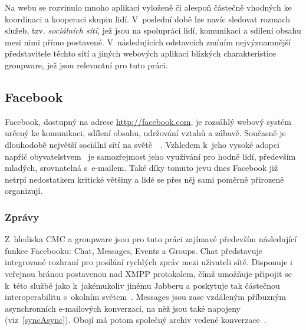 \documentclass[12pt,oneside,final]{fithesis2}
\begin{document}
Na webu se rozvinulo mnoho aplikací vyloženě či alespoň částečně vhodných ke koordinaci a kooperaci skupin lidí. V~poslední době lze navíc sledovat rozmach služeb, tzv. \emph{sociálních sítí}, jež jsou na spolupráci lidí, komunikaci a sdílení obsahu mezi nimi přímo postavené. V~následujících odstavcích zmíním nejvýznamnější představitele těchto sítí a jiných webových aplikací blízkých charakteristice groupware, jež jsou relevantní pro tuto práci.

\subsection{Facebook}\label{facebook}
Facebook, dostupný na adrese \url{http://facebook.com}, je rozsáhlý webový systém určený ke komunikaci, sdílení obsahu, udržování vztahů a zábavě. Současně je dlouhodobě největší sociální sítí na světě~\cite{kazeniac2009social}~\cite{protalinski2012facebook}. Vzhledem k~jeho vysoké adopci napříč obyvatelstvem~\cite{docekal2011socialni} je samozřejmost jeho využívání pro hodně lidí, především mladých, srovnatelná s~e-mailem. Také díky tomuto jevu dnes Facebook již netrpí nedostatkem kritické většiny a lidé se přes něj sami poměrně přirozeně organizují.

\subsubsection*{Zprávy}
Z~hlediska CMC a groupware jsou pro tuto práci zajímavé především následující funkce Facebooku: Chat, Messages, Events a Groups. Chat představuje integrované rozhraní pro posílání rychlých zpráv mezi uživateli sítě. Disponuje i veřejnou bránou postavenou nad XMPP protokolem, čímž umožňuje připojit se k~této službě jako k~jakémukoliv jinému Jabberu a poskytuje tak částečnou interoperabilitu s~okolním světem~\cite{reiss2010facebook}. Messages jsou zase vzdáleným příbuzným asynchronních e-mailových konverzací, na něž jsou také napojeny (viz~\ref{syncAsync}). Obojí má potom společný archiv vedené konverzace~\cite{seligstein2010see}.
\end{document}
